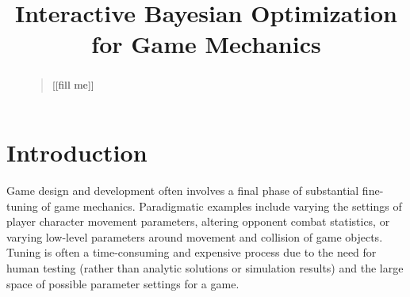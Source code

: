 \documentclass[letterpaper]{article}
\newcommand{\mytodo}[1]{\textbf{[[#1]]}}
\begin{document}
%
\title{Interactive Bayesian Optimization for Game Mechanics}
\author{
}



\maketitle
\begin{abstract}
\begin{quote}
\mytodo{fill me}
\end{quote}
\end{abstract}

\section{Introduction}

\noindent Game design and development often involves a final phase of substantial fine-tuning of game mechanics. Paradigmatic examples include varying the settings of player character movement parameters, altering opponent combat statistics, or varying low-level parameters around movement and collision of game objects. Tuning is often a time-consuming and expensive process due to the need for human testing (rather than analytic solutions or simulation results) and the large space of possible parameter settings for a game.
\end{document}
